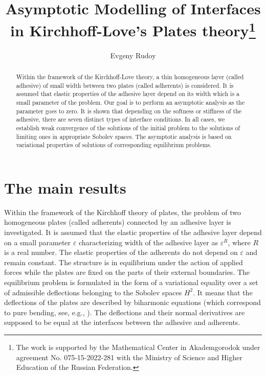\documentclass[12pt]{llncs}
\begin{document}
%
\fi
\title{Asymptotic Mo\-del\-ling of   In\-ter\-faces in Kirchhoff-Love’s Pla\-tes theory\thanks{The work is supported by the Mathematical Center in Akademgorodok under agreement No. 075-15-2022-281 with the Ministry of Science and Higher Education of the Russian Federation.}
}
\author{Evgeny Rudoy
  }



\maketitle

\begin{abstract}
Within the framework of the Kirchhoff-Love theory, a thin
homogeneous layer (called adhesive) of small width between two plates
(called adherents) is considered. It is assumed that elastic properties
of the adhesive layer depend on its width which is a small parameter of
the problem. Our goal is to perform an asymptotic analysis as the
parameter goes to zero. It is shown that depending on the softness or
stiffness of the adhesive, there are seven distinct types of interface
conditions. In all cases, we establish weak convergence of the solutions
of the initial problem to the solutions of limiting ones in appropriate
Sobolev spaces. The asymptotic analysis is based on variational
properties of solutions of corresponding equilibrium problems.

\end{abstract}

\section{The main results}


Within  the framework of the Kirchhoff theory of  plates,  the problem of two  homogeneous plates  (called adherents)  connected  by  an adhesive layer is investigated. It is assumed that the elastic properties of the adhesive layer  depend on a small parameter  $\varepsilon$ characterizing width of the adhesive layer as $\varepsilon^R$, where $R$ is a real number.  The elastic properties of the adherents do not depend on $\varepsilon$ and remain constant.
 The structure is in equilibrium under the action of applied forces while the plates are fixed on the parts of their external boundaries. The equilibrium problem is formulated in the form of a variational equality over a set of admissible deflections belonging to the  Sobolev spaces $H^2$. It means that the deflections of the plates are described by biharmonic equations (which correspond to pure bending, see, e.g., \cite{Destuynder,KhSok}). The deflections and their normal derivatives are supposed to be equal at the interfaces between the adhesive and adherents.
\end{document}
